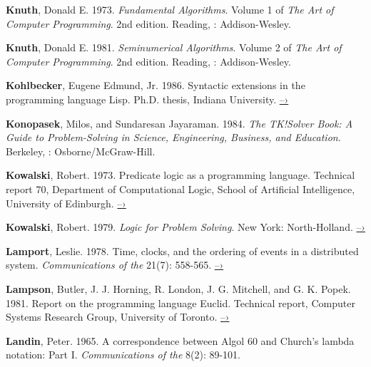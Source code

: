  \label{Knuth (1973)}
\textbf{Knuth}, Donald E.  1973.  \textit{Fundamental Algorithms}. Volume 1 of \textit{The
Art of Computer Programming}.  2nd edition. Reading, : Addison-Wesley.

 \label{Knuth 1981}
\textbf{Knuth}, Donald E.  1981.  \textit{Seminumerical Algorithms}. Volume 2 of \textit{The
Art of Computer Programming}.  2nd edition. Reading, : Addison-Wesley.

 \label{Kohlbecker 1986}
\textbf{Kohlbecker}, Eugene Edmund, Jr. 1986.  Syntactic extensions in the programming
language Lisp.  Ph.D. thesis, Indiana University.
\href{http://www.ccs.neu.edu/scheme/pubs/dissertation-kohlbecker.pdf}{–›}

 \label{Konopasek and Jayaraman 1984}
\textbf{Konopasek}, Milos, and Sundaresan Jayaraman.  1984.  \textit{The TK!Solver Book: A
Guide to Problem-Solving in Science, Engineering, Business, and
Education}. Berkeley, : Osborne/McGraw-Hill.

 \label{Kowalski (1973; 1979)}
\textbf{Kowalski}, Robert.  1973.  Predicate logic as a programming language.  Technical
report 70, Department of Computational Logic, School of Artificial
Intelligence, University of Edinburgh.
\href{http://www.doc.ic.ac.uk/~rak/papers/IFIP\%2074.pdf}{–›}

\textbf{Kowalski}, Robert.  1979.  \textit{Logic for Problem Solving}. New York:
North-Holland.
\href{http://www.doc.ic.ac.uk/\%7Erak/papers/LogicForProblemSolving.pdf}{–›}

 \label{Lamport (1978)}
\textbf{Lamport}, Leslie. 1978.  Time, clocks, and the ordering of events in a
distributed system.  \textit{Communications of the } 21(7): 558-565.
\href{http://research.microsoft.com/en-us/um/people/lamport/pubs/time-clocks.pdf}{–›}

 \label{Lampson et al. 1981}
\textbf{Lampson}, Butler, J. J. Horning, R.  London, J. G. Mitchell, and G. K.  Popek.
1981.  Report on the programming language Euclid.  Technical report, Computer
Systems Research Group, University of Toronto.
\href{http://www.bitsavers.org/pdf/xerox/parc/techReports/CSL-81-12_Report_On_The_Programming_Language_Euclid.pdf}{–›}

 \label{Landin (1965)}
\textbf{Landin}, Peter.  1965.  A correspondence between Algol 60 and Church's lambda
notation: Part I.  \textit{Communications of the } 8(2): 89-101.

